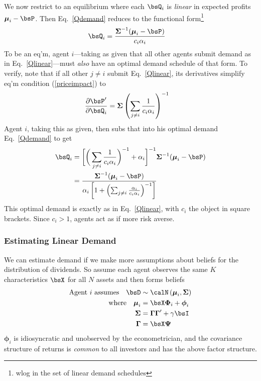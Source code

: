 \documentclass[12pt]{article}
\theoremstyle{plain}
\theoremstyle{definition}
\theoremstyle{remark}
\newcommand{\bsmu}{\boldsymbol{\mu}}
\newcommand{\bsSigma}{\boldsymbol{\Sigma}}
\newcommand{\bsGamma}{\boldsymbol{\Gamma}}
\newcommand{\bsPsi}{\boldsymbol{\Psi}}
\newcommand{\bsPhi}{\boldsymbol{\Phi}}
\newcommand{\bsphi}{\boldsymbol{\phi}}
\begin{document}
\begin{multicols*}{2}
We now restrict to an equilibrium where each $\bsQ_i$ is \emph{linear}
in expected profits $\bsmu_i-\bsP$.  Then Eq.~\ref{Qdemand} reduces to
the functional form\footnote{%
  wlog in the set of linear demand schedules
}
\begin{align}
  \bsQ_i
  &=
  \frac{\bsSigma^{-1}(\bsmu_i-\bsP)}{c_i\alpha_i}
  \label{Qlinear}
\end{align}
To be an eq'm, agent $i$---taking as given that all other agents
submit demand as in Eq.~\ref{Qlinear}---must \emph{also} have an optimal
demand schedule of that form.  To verify, note that if all other
$j\neq i$ submit Eq.~\ref{Qlinear}, its derivatives simplify
eq'm condition (\ref{priceimpact}) to
\begin{align}
  \frac{\partial \bsP'}{\partial \bsQ_i}
  &=
  \bsSigma\left(
  \sum_{j\neq i}
  \frac{1}{c_i\alpha_i}
  \right)^{-1}
\end{align}
Agent $i$, taking this as given, then subs that into his optimal demand
Eq.~\ref{Qdemand} to get
\begin{align*}
  \bsQ_i
  &=
  \bigg[
  \bigg(
  \sum_{j\neq i}
  \frac{1}{c_i\alpha_i}
  \bigg)^{-1}
  + \alpha_i
  \bigg]^{-1}
  \bsSigma^{-1}(\bsmu_i-\bsP)
  \\
  &=
  \frac{\bsSigma^{-1}(\bsmu_i-\bsP)}{%
  \alpha_i
  \left[
  1
  +
  \left(
  \sum_{j\neq i}
  \frac{\alpha_i}{c_i\alpha_i}
  \right)^{-1}
  \right]
  }
\end{align*}
This optimal demand is exactly as in Eq.~\ref{Qlinear}, with $c_i$ the
object in square brackets. Since $c_i>1$, agents act as if more risk
averse.


\subsubsection{Estimating Linear Demand}

We can estimate demand if we make more assumptions about beliefs for the
distribution of dividends. So assume each agent observes the same $K$
characteristics $\bsX$ for all $N$ assets and then forms beliefs
\begin{align*}
  \text{Agent $i$ assumes}\quad
  \bsD &\sim
  \calN\left(
  \bsmu_i,\bsSigma
  \right)
  \\
  \text{where}\quad
  \bsmu_i
  &= \bsX\bsPhi_i + \bsphi_i \\
  \bsSigma
  &= \bsGamma\bsGamma'+\gamma\bsI \\
  \bsGamma
  &= \bsX\bsPsi
\end{align*}
$\bsphi_i$ is idiosyncratic and unobserved by the econometrician, and
the covariance structure of returns is \emph{common} to all investors
and has the above factor structure.


\end{multicols*}
\end{document}
